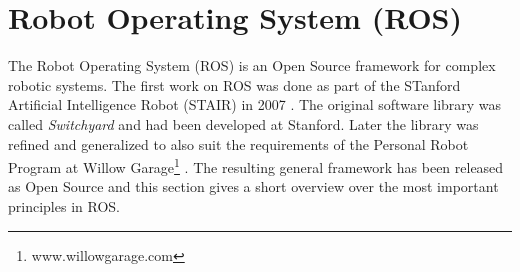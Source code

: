 


\section{Robot Operating System (ROS)}
The Robot Operating System (ROS) is an Open Source framework for complex robotic systems. The first work on ROS was done as part of the STanford Artificial Intelligence Robot (STAIR) in 2007 \cite{Quigley2007}. The original software library was called \emph{Switchyard} and had been developed at Stanford. Later the library was refined and generalized to also suit the requirements of the Personal Robot Program at Willow Garage\footnote{www.willowgarage.com} \cite{Quigley2009}. The resulting general framework has been released as Open Source \cite{Quigley2009} and this section gives a short overview over the most important principles in ROS.


